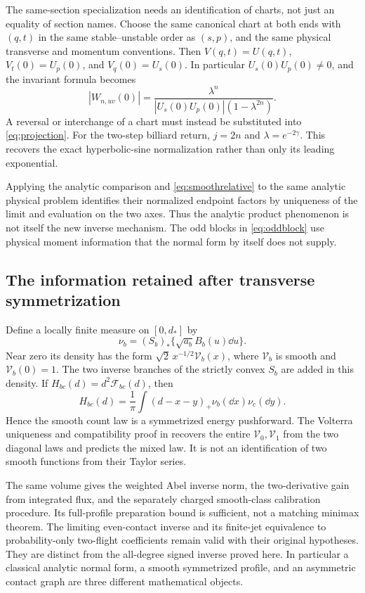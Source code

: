 The same-section specialization needs an identification of charts, not
just an equality of section names. Choose the same canonical chart at
both ends with $(q,t)$ in the same stable--unstable order as $(s,p)$,
and the same physical transverse and momentum conventions. Then
$V(q,t)=U(q,t)$, $V_t(0)=U_p(0)$, and $V_q(0)=U_s(0)$.
In particular $U_s(0)U_p(0)\ne0$, and the invariant formula becomes
\begin{equation}\label{eq:samesection}
 |W_{n,uv}(0)|=
 \frac{\lambda^n}{|U_s(0)U_p(0)|(1-\lambda^{2n})}.
\end{equation}
A reversal or interchange of a chart must instead be substituted into
\eqref{eq:projection}. For the two-step billiard return, $j=2n$ and
$\lambda=e^{-2\gamma}$. This recovers the exact hyperbolic-sine
normalization rather than only its leading exponential.

Applying the analytic comparison and \eqref{eq:smoothrelative} to the
same analytic physical problem identifies their normalized endpoint
factors by uniqueness of the limit and evaluation on the two axes.
Thus the analytic product phenomenon is not itself the new inverse
mechanism. The odd blocks in \eqref{eq:oddblock} use physical moment
information that the normal form by itself does not supply.

\subsection{The information retained after transverse symmetrization}
Define a locally finite measure on $[0,d_*]$ by
\[
 \nu_b=(S_b)_*\{\sqrt{a_b}B_b(u)\dd u\}.
\]
Near zero its density has the form
$\sqrt2\,x^{-1/2}\mathcal V_b(x)$, where
$\mathcal V_b$ is smooth and $\mathcal V_b(0)=1$.
The two inverse branches of the strictly convex $S_b$ are added in
this density. If $H_{bc}(d)=d^2\mathcal F_{bc}(d)$, then
\[
 H_{bc}(d)=\frac1\pi\int(d-x-y)_+\nu_b(\dd x)\nu_c(\dd y).
\]
Hence the smooth count law is a symmetrized energy pushforward.
The Volterra uniqueness and compatibility proof in \cite{Companion}
recovers the entire $\mathcal V_0,\mathcal V_1$ from the two
diagonal laws and predicts the mixed law. It is not an identification
of two smooth functions from their Taylor series.

The same volume gives the weighted Abel inverse norm, the two-derivative
gain from integrated flux, and the separately charged smooth-class
calibration procedure. Its full-profile preparation bound is sufficient,
not a matching minimax theorem. The limiting even-contact inverse and
its finite-jet equivalence to probability-only two-flight coefficients
remain valid with their original hypotheses. They are distinct from
the all-degree signed inverse proved here. In particular a classical
analytic normal form, a smooth symmetrized profile, and an asymmetric
contact graph are three different mathematical objects.
